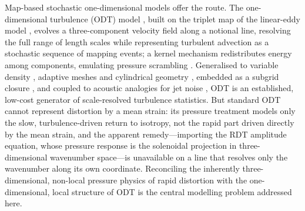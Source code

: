 \documentclass[lineno]{JFM-FLM_Au}
\begin{document}
Map-based stochastic one-dimensional models offer the route. The
one-dimensional turbulence (ODT) model
\citep{Kerstein1999,Kerstein2001}, built on the triplet map of the
linear-eddy model \citep{Kerstein1991}, evolves a three-component
velocity field along a notional line, resolving the full range of length
scales while representing turbulent advection as a stochastic sequence
of mapping events; a kernel mechanism redistributes energy among
components, emulating pressure scrambling
\citep{WunschKerstein2001,Kerstein2001}. Generalised to variable density
\citep{AshurstKerstein2005}, adaptive meshes \citep{Lignell2013,
StephensLignell2021} and cylindrical geometry \citep{Lignell2018},
embedded as a subgrid closure \citep{SchmidtKerstein2010}, and coupled
to acoustic analogies for jet noise
\citep{SharmaKleinSchmidt2022,MedinaMendez2023}, ODT is an established, low-cost generator of scale-resolved turbulence statistics. But standard ODT
cannot represent distortion by a mean strain: its pressure treatment
models only the slow, turbulence-driven return to isotropy, not the
rapid part driven directly by the mean strain, and the
apparent remedy---importing the RDT amplitude equation, whose pressure
response is the solenoidal projection in three-dimensional wavenumber
space---is unavailable on a line that resolves only the wavenumber along
its own coordinate. Reconciling the inherently three-dimensional,
non-local pressure physics of rapid distortion with the one-dimensional,
local structure of ODT is the central modelling problem addressed here.
\end{document}
